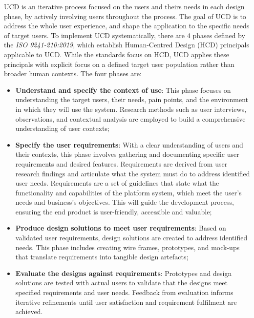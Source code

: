 UCD is an iterative process focused on the users and theirs needs in each design phase, by actively involving users throughout the process. The goal of UCD is to address the whole user experience, and shape the application to the specific needs of target users\cite{IxDF2025}. To implement UCD systematically, there are 4 phases defined by the \textit{ISO 9241-210:2019}\cite{iso9241-210}, which establish Human-Centred Design (HCD) principals applicable to UCD. While the standards focus on HCD, UCD applies these principals with explicit focus on a defined target user population rather than broader human contexts. The four phases are:

\begin{itemize}
	\item \textbf{Understand and specify the context of use}: This phase focuses on understanding the target users, their needs, pain points, and the environment in which they will use the system. Research methods such as user interviews, observations, and contextual analysis are employed to build a comprehensive understanding of user contexts;
	
	\item \textbf{Specify the user requirements}: With a clear understanding of users and their contexts, this phase involves gathering and documenting specific user requirements and desired features. Requirements are derived from user research findings and articulate what the system must do to address identified user needs. Requirements are a set of guidelines that state what the functionality and capabilities of the platform system, which meet the user's needs and business's objectives. This will guide the development process, ensuring the end product is user-friendly, accessible and valuable\cite{requirementsIDF};
	
	\item \textbf{Produce design solutions to meet user requirements}: Based on validated user requirements, design solutions are created to address identified needs. This phase includes creating wire frames, prototypes, and mock-ups that translate requirements into tangible design artefacts;
	
	\item \textbf{Evaluate the designs against requirements}: Prototypes and design solutions are tested with actual users to validate that the designs meet specified requirements and user needs. Feedback from evaluation informs iterative refinements until user satisfaction and requirement fulfilment are achieved.
\end{itemize}

